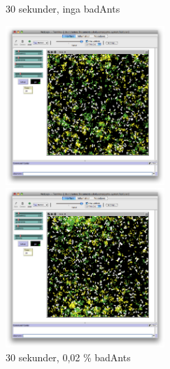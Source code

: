 \documentclass[titlepage, a4paper, 12pt]{article}
\begin{document}
\begin{figure}
  \begin{minipage}[b]{0.5\linewidth} %
    \centering
    \caption{30 sekunder, inga badAnts}
    \includegraphics[width=6cm]{images/no-bad-30.png}
  \end{minipage}
  \hspace{0.5cm} %
  \begin{minipage}[b]{0.5\linewidth}
    \centering
    \caption{30 sekunder, 0,02 \% badAnts}
    \includegraphics[width=6cm]{images/10-bad-30.png}
  \end{minipage}


\end{figure}
\end{document}
